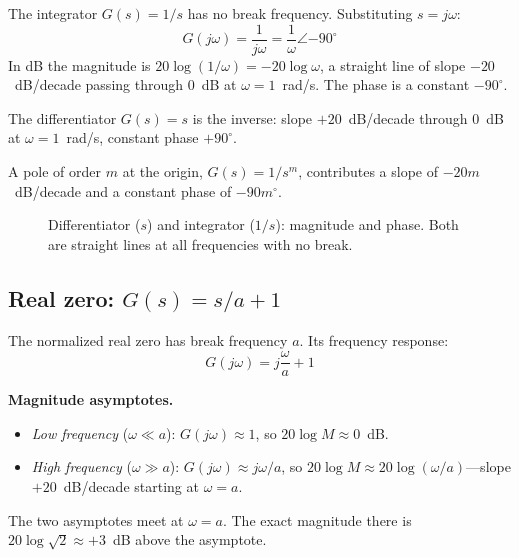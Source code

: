 \documentclass[../../book.tex]{subfiles}
\begin{document}
The integrator $G(s) = 1/s$ has no break frequency.  Substituting $s=j\omega$:
\begin{equation}
  G(j\omega) = \frac{1}{j\omega} = \frac{1}{\omega}\angle{-90^\circ}
  \label{eq:integrator}
\end{equation}
In dB the magnitude is $20\log(1/\omega) = -20\log\omega$, a straight line of
slope $-20$~dB/decade passing through 0~dB at $\omega = 1$~rad/s.  The phase
is a constant $-90^\circ$.

The differentiator $G(s) = s$ is the inverse: slope $+20$~dB/decade through
0~dB at $\omega = 1$~rad/s, constant phase $+90^\circ$.

A pole of order $m$ at the origin, $G(s) = 1/s^m$, contributes a slope of
$-20m$~dB/decade and a constant phase of $-90m^\circ$.

\begin{figure}[htbp]
  \caption{Differentiator ($s$) and integrator ($1/s$): magnitude and phase.
    Both are straight lines at all frequencies with no break.}
  \label{fig:blocks_s_1s}
\end{figure}

\subsection{Real zero: \texorpdfstring{$G(s) = s/a + 1$}{G(s) = s/a + 1}}
\label{sec:real_zero}

The normalized real zero has break frequency $a$.  Its frequency response:
\begin{equation}
  G(j\omega) = j\frac{\omega}{a} + 1
  \label{eq:real_zero_gjw}
\end{equation}

\textbf{Magnitude asymptotes.}
\begin{itemize}
  \item \emph{Low frequency} ($\omega \ll a$): $G(j\omega) \approx 1$,
    so $20\log M \approx 0$~dB.
  \item \emph{High frequency} ($\omega \gg a$): $G(j\omega) \approx j\omega/a$,
    so $20\log M \approx 20\log(\omega/a)$---slope $+20$~dB/decade starting at
    $\omega = a$.
\end{itemize}
The two asymptotes meet at $\omega = a$.  The exact magnitude there is
$20\log\sqrt{2} \approx +3$~dB above the asymptote.
\end{document}
